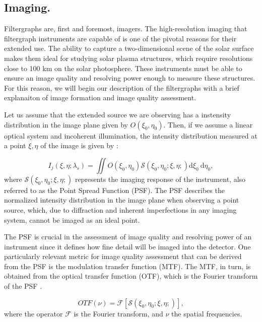 \subsection{Imaging.}

Filtergraphs are, first and foremost, imagers. The high-resolution imaging that filtergraph instruments are capable of is one of the pivotal reasons for their extended use. The ability to capture a two-dimensional scene of the solar surface makes them ideal for studying solar plasma structures, which require resolutions close to 100 km on the solar photosphere. These instruments must be able to ensure an image quality and resolving power enough to measure these structures. For this reason, we will begin our description of the filtergraphs with a brief explanaiton of image formation and image quality assessment. 

Let us assume that the extended source we are observing has a instensity distribution in the image plane given by $O(\xi _ 0, \eta _ 0)$. Then, if we assume a linear optical system and incoherent illumination, the intensity distribution measured at a point $\xi, \eta$ of the image is given by : 

\begin{equation}
  I_ j\left(\xi, \eta ; \lambda_{s}\right)= \iint  O\left(\xi_0, \eta_0\right)  \mathcal{S}\left(\xi_0, \eta_0; \xi , \eta;\right)  \mathrm{d} \xi_{0} \mathrm{~d} \eta_{0},
  \label{eq_spectro: intensity_simple}
\end{equation}
where $\mathcal{S}\left(\xi_0, \eta_0; \xi , \eta;\right)$ represents the imaging response of the instrument, also referred to as the Point Spread Function (PSF). The PSF describes the normalized intensity distribution in the image plane when observing a point source, which, due to diffraction and inherent imperfections in any imaging system, cannot be imaged as an ideal point.

The PSF is crucial in the assessment of image quality and resolving power of an instrument since it defines how fine detail will be imaged into the detector. One particularly relevant metric for image quality assessment that can be derived from the PSF is the modulation transfer function (MTF). The MTF, in turn, is obtained from the optical transfer function (OTF), which is the Fourier transform of the PSF \citep{vargas_tesis}. 

\begin{equation}
  OTF(\nu) = \mathcal{F}\left[\mathcal{S}\left(\xi_0, \eta_0; \xi , \eta;\right)\right],
\end{equation}
where the operator $\mathcal{F}$ is the Fourier transform, and $\nu$ the spatial frequencies.

